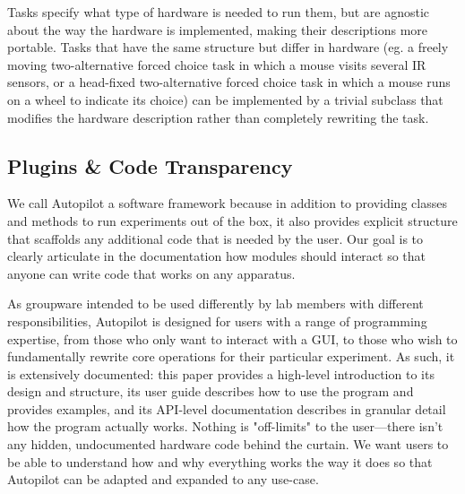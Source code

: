 Tasks specify what type of hardware is needed to run them, but are agnostic about the way the hardware is implemented, making their descriptions more portable. Tasks that have the same structure but differ in hardware (eg. a freely moving two-alternative forced choice task in which a mouse visits several IR sensors, or a head-fixed two-alternative forced choice task in which a mouse runs on a wheel to indicate its choice) can be implemented by a trivial subclass that modifies  the hardware description rather than completely rewriting the task.

\subsection{Plugins \& Code Transparency}
\label{sec:expansion}

We call Autopilot a software framework because in addition to providing classes and methods to run experiments out of the box, it also provides explicit structure that scaffolds any additional code that is needed by the user. Our goal is to clearly articulate in the documentation how modules should interact so that anyone can write code that works on any apparatus. 

As groupware intended to be used differently by lab members with different responsibilities, Autopilot is designed for users with a range of programming expertise, from those who only want to interact with a GUI, to those who wish to fundamentally rewrite core operations for their particular experiment. As such, it is extensively documented: this paper provides a high-level introduction to its design and structure, its user guide describes how to use the program and provides examples, and its API-level documentation describes in granular detail how the program actually works. Nothing is "off-limits" to the user---there isn't any hidden, undocumented hardware code behind the curtain. We want users to be able to understand how and why everything works the way it does so that Autopilot can be adapted and expanded to any use-case.

